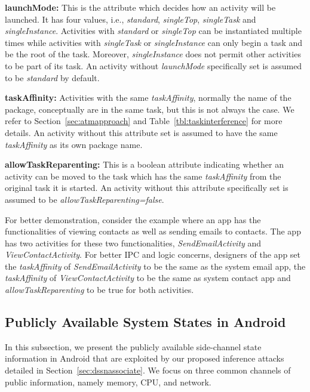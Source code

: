 \documentclass[letterpaper,12pt]{article}
\begin{document}
\textbf{launchMode:} This is the attribute which decides how an activity
will be launched. It has four values, i.e., \textit{standard},
\textit{singleTop}, \textit{singleTask} and
\textit{singleInstance}. Activities with \textit{standard} or
\textit{singleTop} can be instantiated multiple times while activities
with \textit{singleTask} or \textit{singleInstance} can only begin a
task and be the root of the task. Moreover, \textit{singleInstance}
does not permit other activities to be part of its task. An
activity without \textit{launchMode} specifically set is
assumed to be \textit{standard} by default.

\textbf{taskAffinity:} Activities with the same \textit{taskAffinity},
normally the name of the package, conceptually are in the same task,
but this is not always the case. We refer to
Section~\ref{sec:atmapproach} and Table~\ref{tbl:taskinterference} for
more details. An activity without this attribute set is assumed to
have the same \textit{taskAffinity} as its own package name.

\textbf{allowTaskReparenting:} This is a boolean attribute indicating
whether an activity can be moved to the task which has the same
\textit{taskAffinity} from the original task it is started. An
activity without this attribute specifically set is assumed to be
\emph{allowTaskReparenting=false}.

For better demonstration, consider the example where an app has the
functionalities of viewing contacts as well as sending emails to
contacts. The app has two activities for these two functionalities,
\textit{SendEmailActivity} and \textit{ViewContactActivity}. For
better IPC and logic concerns, designers of the app set the
\textit{taskAffinity} of \textit{SendEmailActivity} to be the same as
the system email app, the \textit{taskAffinity} of
\textit{ViewContactActivity} to be the same as system contact app and
\textit{allowTaskReparenting} to be true for both activities.

\subsection{Publicly Available System States in Android}
In this subsection, we present the publicly available side-channel state information in Android that are exploited by our proposed inference attacks detailed in Section~\ref{sec:dssnassociate}. We focus on three common channels of public information, namely memory, CPU, and network.
\end{document}
